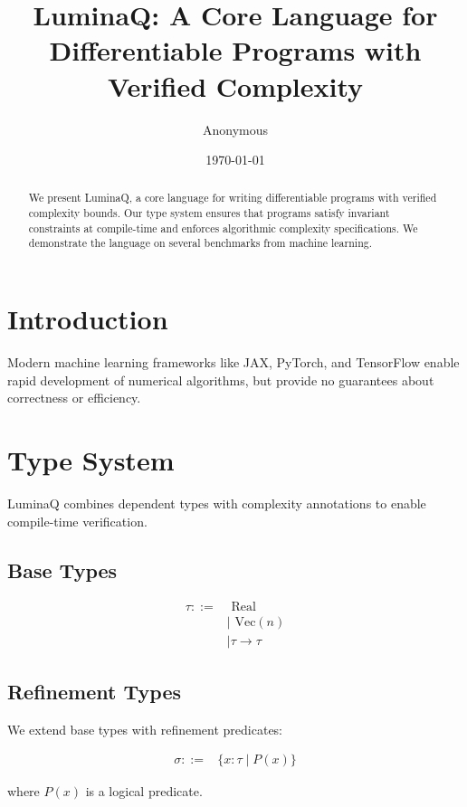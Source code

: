 \documentclass{article}
\title{LuminaQ: A Core Language for Differentiable Programs with Verified Complexity}
\author{Anonymous}
\date{\today}
\begin{document}
\maketitle

\begin{abstract}
We present LuminaQ, a core language for writing differentiable programs with verified complexity bounds.
Our type system ensures that programs satisfy invariant constraints at compile-time and enforces
algorithmic complexity specifications. We demonstrate the language on several benchmarks from machine learning.
\end{abstract}

\section{Introduction}

Modern machine learning frameworks like JAX, PyTorch, and TensorFlow enable rapid development of
numerical algorithms, but provide no guarantees about correctness or efficiency.

\section{Type System}

LuminaQ combines dependent types with complexity annotations to enable compile-time verification.

\subsection{Base Types}

\begin{align}
\tau ::= & \text{ Real} \\
      & \mid \text{ Vec}(n) \\
      & \mid \tau \to \tau
\end{align}

\subsection{Refinement Types}

We extend base types with refinement predicates:

\begin{align}
\sigma ::= & \{x : \tau \mid P(x)\}
\end{align}

where $P(x)$ is a logical predicate.
\end{document}
